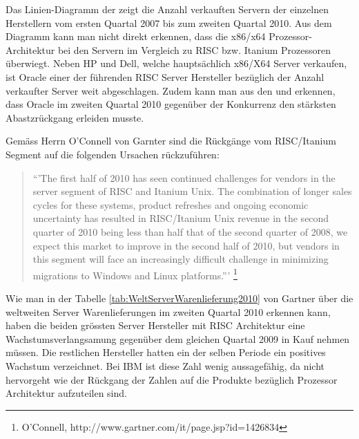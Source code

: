 Das Linien-Diagramm der  zeigt die Anzahl verkauften Servern der einzelnen Herstellern vom ersten Quartal 2007 bis zum zweiten Quartal 2010. 
Aus dem Diagramm kann man nicht direkt erkennen, dass die x86/x64 Prozessor-Architektur bei den Servern im Vergleich zu RISC bzw. Itanium Prozessoren überwiegt. Neben HP und Dell, welche hauptsächlich x86/X64 Server verkaufen, ist Oracle einer der führenden RISC Server Hersteller bezüglich der Anzahl verkaufter Server weit abgeschlagen. Zudem kann man aus den  und  erkennen, dass Oracle im zweiten Quartal 2010 gegenüber der Konkurrenz den stärksten Abastzrückgang erleiden musste.

Gemäss Herrn O'Connell von Garnter sind die Rückgänge vom RISC/Itanium Segment auf die folgenden Ursachen rückzuführen:

\begin{quote}
“'The first half of 2010 has seen continued challenges for vendors in the server segment of RISC and Itanium Unix. The combination of longer sales cycles for these systems, product refreshes and ongoing economic uncertainty has resulted in RISC/Itanium Unix revenue in the second quarter of 2010 being less than half that of the second quarter of 2008, we expect this market to improve in the second half of 2010, but vendors in this segment will face an increasingly difficult challenge in minimizing migrations to Windows and Linux platforms.”'
\footnote{O’Connell, http://www.gartner.com/it/page.jsp?id=1426834}
\end{quote}

Wie man in der Tabelle \ref{tab:WeltServerWarenlieferung2010} von Gartner über die weltweiten Server Warenlieferungen im zweiten Quartal 2010 erkennen kann, haben die beiden grössten Server Hersteller mit RISC Architektur eine Wachstumsverlangsamung gegenüber dem gleichen Quartal 2009 in Kauf nehmen müssen. Die restlichen Hersteller hatten ein der selben Periode ein positives Wachstum verzeichnet. Bei IBM ist diese Zahl wenig aussagefähig, da nicht hervorgeht wie der Rückgang der Zahlen auf die Produkte bezüglich Prozessor Architektur aufzuteilen sind.


